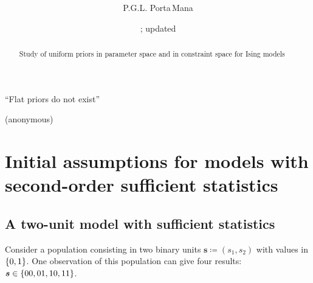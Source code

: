\documentclass[\ifafour a4paper,12pt,\else a5paper,10pt,\fi%
onecolumn,oneside,article,%
british%
]{memoir}
\title{\propertitle%
}
\author{%
\hspace*{\stretch{1}}%
\parbox{0.5\linewidth}%
{\protect\centering P.G.L. Porta\,Mana\\%
\footnotesize\epost{\email{piero.mana}{ntnu.no}}}%
\hspace*{\stretch{1}}%
}
\date{\firstdraft; updated \updated}
\theoremstyle{remark}
\theoremstyle{innote}
\newcommand*{\asudedication}[1]{%
{\par\centering\textit{#1}\par}}
\newcommand*{\defd}{\coloneqq}
\DeclarePairedDelimiter\set{\{}{\}}
\renewcommand*{\|}{\mathpunct{|}}
\newcommand*{\ys}{\bm{s}}
\begin{document}
\captiondelim{\quad}\captionnamefont{\footnotesize}\captiontitlefont{\footnotesize}
\frenchspacing

\maketitle
\ifpublic
\abstractrunin
\abslabeldelim{}
\renewcommand*{\abstractname}{}
\setlength{\absleftindent}{0pt}
\setlength{\absrightindent}{0pt}
\setlength{\abstitleskip}{-\absparindent}
\begin{abstract}%
  \noindent Study of uniform priors in parameter space and in constraint
  space for Ising models
\end{abstract}\fi

\frenchspacing

\setlength{\epigraphwidth}{.63\columnwidth}
\epigraphfontsize{\footnotesize}
\setlength{\epigraphrule}{0pt}
\epigraph{\enquote{Flat priors do not exist}}{(anonymous)}

\section{Initial assumptions for models with second-order sufficient
  statistics}
\label{sec:2_suff_stat}

\subsection{A two-unit model with sufficient statistics}
\label{sec:intro}

Consider a population consisting in two binary units $\ys \defd (s_1,s_2)$
with values in $\set{0,1}$. One observation of this population can give
four results: $\ys \in \set{00,01,10,11}$.
\end{document}
